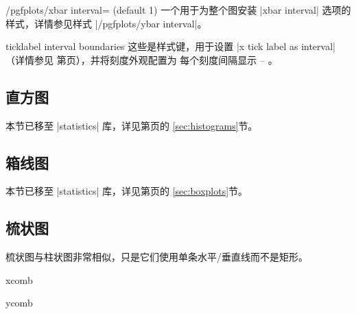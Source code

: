 {\begin{stylekey}{/pgfplots/xbar interval= (default 1)}
    一个用于为整个图安装 |xbar interval| 选项的样式，详情参见样式
    |/pgfplots/ybar interval|。
\end{stylekey}

\begin{pgfplotsxykey}{\x ticklabel interval boundaries}
    这些是样式键，用于设置 |x tick label as interval|（详情参见
    第\pageref{key:pgfplots:ticklabelasinterval}页），并将刻度外观配置为
    每个刻度间隔显示  -- 。
\end{pgfplotsxykey}


\subsection{直方图}

本节已移至 |statistics| 库，详见第\pageref{sec:histograms}页的
\ref{sec:histograms}节。


\subsection{箱线图}

本节已移至 |statistics| 库，详见第\pageref{sec:boxplots}页的
\ref{sec:boxplots}节。


\subsection{梳状图}

梳状图与柱状图非常相似，只是它们使用单条水平/垂直线而不是矩形。

\begin{plottype}{xcomb}
\begin{codeexample}[]
\end{codeexample}
\end{plottype}

\begin{plottype}{ycomb}
\begin{codeexample}[]
\end{codeexample}
\end{plottype}


}
